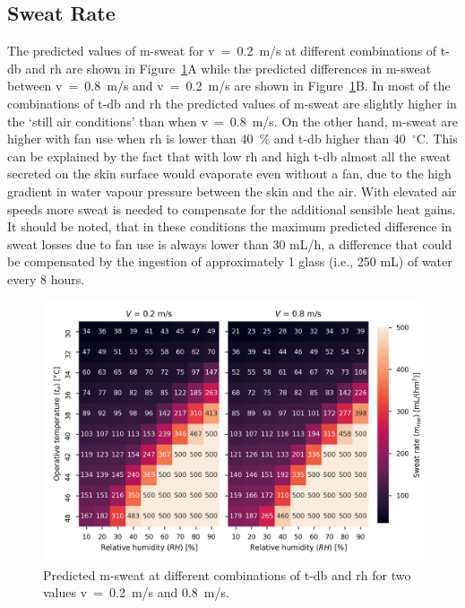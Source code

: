 \subsection{Sweat Rate}\label{subsec:sweat-rate}

The predicted values of \ac{m-sweat} for \ac{v}~=~0.2~m/s at different combinations of \ac{t-db} and \ac{rh} are shown in Figure~\ref{fig:sweat_rate}A while the predicted differences in \ac{m-sweat} between \ac{v}~=~0.8~m/s and \ac{v}~=~0.2~m/s are shown in Figure~\ref{fig:sweat_rate}B\@.
In most of the combinations of \ac{t-db} and \ac{rh} the predicted values of \ac{m-sweat} are slightly higher in the `still air conditions' than when \ac{v}~=~0.8~m/s.
On the other hand, \ac{m-sweat} are higher with fan use when \ac{rh} is lower than 40~\% and \ac{t-db} higher than 40~$^{\circ}$C\@.
This can be explained by the fact that with low \ac{rh} and high \ac{t-db} almost all the sweat secreted on the skin surface would evaporate even without a fan, due to the high gradient in water vapour pressure between the skin and the air.
With elevated air speeds more sweat is needed to compensate for the additional sensible heat gains.
It should be noted, that in these conditions the maximum predicted difference in sweat losses due to fan use is always lower than 30 mL/h, a difference that could be compensated by the ingestion of approximately 1 glass (i.e., 250 mL) of water every 8 hours.

\begin{figure}[thb!]
    \centering
    \includegraphics[width=\textwidth]{figures/sweat_rate}
    \caption{Predicted \acf{m-sweat} at different combinations of \acf{t-db} and \acf{rh} for two values \acf{v}~=~0.2~m/s and 0.8~m/s.}
    \label{fig:sweat_rate}
\end{figure}

